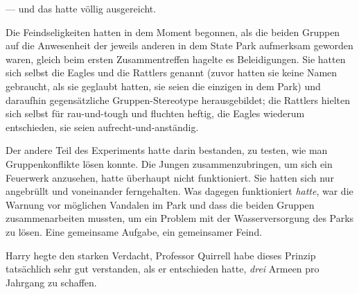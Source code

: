 — und das hatte völlig ausgereicht.

Die Feindseligkeiten hatten in dem Moment begonnen, als die beiden Gruppen auf die Anwesenheit der jeweils anderen in dem State Park aufmerksam geworden waren, gleich beim ersten Zusammentreffen hagelte es Beleidigungen. Sie hatten sich selbst die Eagles und die Rattlers genannt (zuvor hatten sie keine Namen gebraucht, als sie geglaubt hatten, sie seien die einzigen in dem Park) und daraufhin gegensätzliche Gruppen-Stereotype herausgebildet; die Rattlers hielten sich selbst für rau-und-tough und fluchten heftig, die Eagles wiederum entschieden, sie seien aufrecht-und-anständig.

Der andere Teil des Experiments hatte darin bestanden, zu testen, wie man Gruppenkonflikte lösen konnte. Die Jungen zusammenzubringen, um sich ein Feuerwerk anzusehen, hatte überhaupt nicht funktioniert. Sie hatten sich nur angebrüllt und voneinander ferngehalten. Was dagegen funktioniert \emph{hatte}, war die Warnung vor möglichen Vandalen im Park und dass die beiden Gruppen zusammenarbeiten mussten, um ein Problem mit der Wasserversorgung des Parks zu lösen. Eine gemeinsame Aufgabe, ein gemeinsamer Feind.

Harry hegte den starken Verdacht, Professor Quirrell habe dieses Prinzip tatsächlich sehr gut verstanden, als er entschieden hatte, \emph{drei} Armeen pro Jahrgang zu schaffen.

